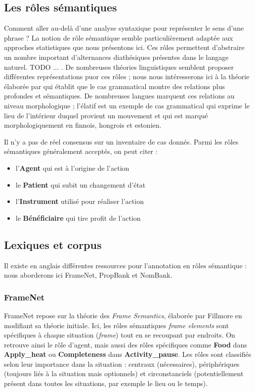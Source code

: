 \subsection{Les rôles sémantiques}
\label{subsec:roles_semantiques}

Comment aller au-delà d'une analyse syntaxique pour représenter le sens d'une
phrase ? La notion de rôle sémantique semble particulièrement adaptée aux
approches statistiques que nous présentons ici. Ces rôles permettent
d'abstraire un nombre important d'alternances diathésiques présentes dans le
langage naturel. TODO ... . De nombreuses théories linguistiques semblent
proposer différentes représentations puor ces rôles ; nous nous intéresserons
ici à la théorie élaborée par \cite{fillmore1968case} qui établit que le cas
grammatical montre des relations plus profondes et sémantiques. De nombreuses
langues marquent ces relations au niveau morphologique ; l'élatif est un
exemple de cas grammatical qui exprime le lieu de l'intérieur duquel provient
un mouvement et qui est marqué morphologiquement en finnois, hongrois et
estonien.

Il n'y a pas de réel consensus sur un inventaire de cas donnés. Parmi les rôles
sémantiques généralement acceptés, on peut citer :

\begin{itemize}
    \item l'\textbf{Agent} qui est à l'origine de l'action
    \item le \textbf{Patient} qui subit un changement d'état
    \item l'\textbf{Instrument} utilisé pour réaliser l'action
    \item le \textbf{Bénéficiaire} qui tire profit de l'action
\end{itemize}

\subsection{Lexiques et corpus}

Il existe en anglais différentes ressources pour l'annotation en rôles
sémantique : nous aborderons ici FrameNet, PropBank et NomBank.

\subsubsection{FrameNet}

FrameNet repose sur la théorie des \textit{Frame Semantics}, élaborée par
Fillmore en modifiant sa théorie initiale. Ici, les rôles sémantiques
\textit{frame elements} sont spécifiques à chaque situation (\textit{frame})
tout en se recoupant par endroits. On retrouve ainsi le rôle d'agent, mais
aussi des rôles spécifiques comme \textbf{Food} dans \textbf{Apply\_heat} ou
\textbf{Completeness} dans \textbf{Activity\_pause}. Les rôles sont classifiés
selon leur importance dans la situation : centraux (nécessaires), périphériques
(toujours liés à la situation mais optionnels) et circonstanciels
(potentiellement présent dans toutes les situations, par exemple le lieu ou le
temps).

